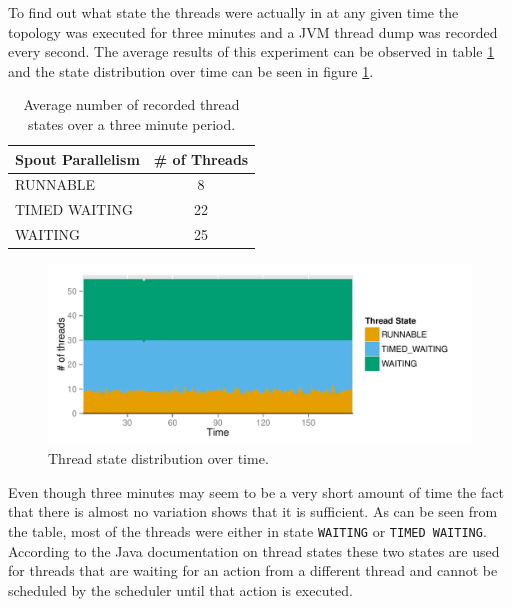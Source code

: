 \documentclass[bsc,logo,frontabs,twoside,singlespacing,normalheadings,parskip]{infthesis}\usepackage[]{graphicx}\usepackage[]{color}
\makeatletter
\def\maxwidth{ %
  \ifdim\Gin@nat@width>\linewidth
    \linewidth
  \else
    \Gin@nat@width
  \fi
}
\newenvironment{knitrout}{}{} %
\makeatother
\begin{document}
To find out what state the threads were actually in at any given time the topology was executed for three minutes and a JVM thread dump was recorded every second. The average results of this experiment can be observed in table \ref{table:dump} and the state distribution over time can be seen in figure \ref{fig:dump-plot}.

\begin{table}[h!]
\centering
\begin{tabular}{@{}lc@{}}
    \textbf{Spout Parallelism} & \textbf{\# of Threads} \\ \toprule
    RUNNABLE & 8  \\
	TIMED WAITING & 22  \\
    WAITING & 25  \\
\end{tabular}
\caption{Average number of recorded thread states over a three minute period.}
\label{table:dump}
\end{table}

\begin{knitrout}
\color{fgcolor}\begin{figure}
\includegraphics[width=\maxwidth]{figure/dump-plot-1} \caption[Thread state distribution over time]{Thread state distribution over time.}\label{fig:dump-plot}
\end{figure}


\end{knitrout}

Even though three minutes may seem to be a very short amount of time the fact that there is almost no variation shows that it is sufficient. As can be seen from the table, most of the threads were either in state \texttt{WAITING} or \texttt{TIMED WAITING}. According to the Java documentation on thread states \citep{JavaThreads} these two states are used for threads that are waiting for an action from a different thread and cannot be scheduled by the scheduler until that action is executed.
\end{document}
